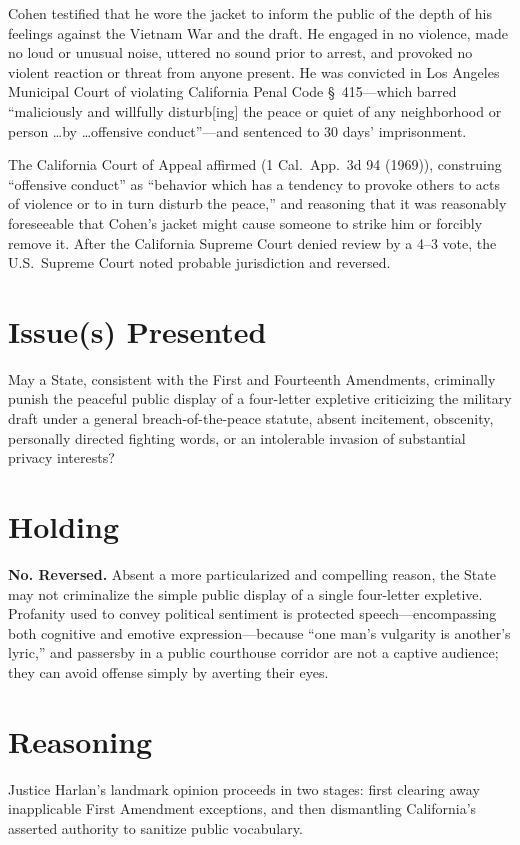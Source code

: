 \documentclass[12pt]{article}
\begin{document}
Cohen testified that he wore the jacket to inform the public of the depth of his feelings against the Vietnam War and the draft. He engaged in no violence, made no loud or unusual noise, uttered no sound prior to arrest, and provoked no violent reaction or threat from anyone present. He was convicted in Los Angeles Municipal Court of violating California Penal Code \S~415---which barred ``maliciously and willfully disturb[ing] the peace or quiet of any neighborhood or person \dots by \dots offensive conduct''---and sentenced to 30 days' imprisonment.

The California Court of Appeal affirmed (1 Cal.\ App.\ 3d 94 (1969)), construing ``offensive conduct'' as ``behavior which has a tendency to provoke others to acts of violence or to in turn disturb the peace,'' and reasoning that it was reasonably foreseeable that Cohen's jacket might cause someone to strike him or forcibly remove it. After the California Supreme Court denied review by a 4--3 vote, the U.S.\ Supreme Court noted probable jurisdiction and reversed.

\section{Issue(s) Presented}
May a State, consistent with the First and Fourteenth Amendments, criminally punish the peaceful public display of a four-letter expletive criticizing the military draft under a general breach-of-the-peace statute, absent incitement, obscenity, personally directed fighting words, or an intolerable invasion of substantial privacy interests?

\section{Holding}
\textbf{No. Reversed.} Absent a more particularized and compelling reason, the State may not criminalize the simple public display of a single four-letter expletive. Profanity used to convey political sentiment is protected speech---encompassing both cognitive and emotive expression---because ``one man's vulgarity is another's lyric,'' and passersby in a public courthouse corridor are not a captive audience; they can avoid offense simply by averting their eyes.

\section{Reasoning}
Justice Harlan's landmark opinion proceeds in two stages: first clearing away inapplicable First Amendment exceptions, and then dismantling California's asserted authority to sanitize public vocabulary.
\end{document}
